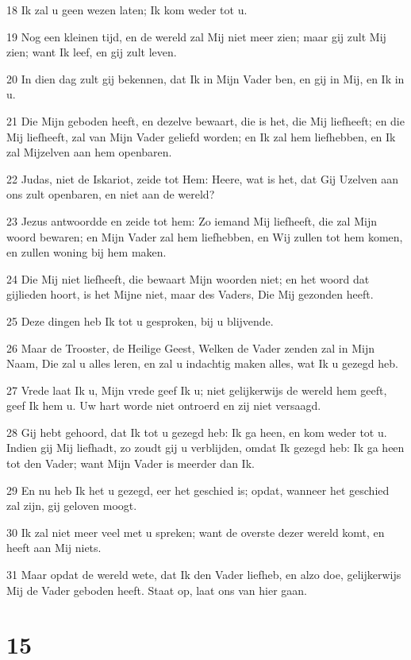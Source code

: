 \par 18 Ik zal u geen wezen laten; Ik kom weder tot u.
\par 19 Nog een kleinen tijd, en de wereld zal Mij niet meer zien; maar gij zult Mij zien; want Ik leef, en gij zult leven.
\par 20 In dien dag zult gij bekennen, dat Ik in Mijn Vader ben, en gij in Mij, en Ik in u.
\par 21 Die Mijn geboden heeft, en dezelve bewaart, die is het, die Mij liefheeft; en die Mij liefheeft, zal van Mijn Vader geliefd worden; en Ik zal hem liefhebben, en Ik zal Mijzelven aan hem openbaren.
\par 22 Judas, niet de Iskariot, zeide tot Hem: Heere, wat is het, dat Gij Uzelven aan ons zult openbaren, en niet aan de wereld?
\par 23 Jezus antwoordde en zeide tot hem: Zo iemand Mij liefheeft, die zal Mijn woord bewaren; en Mijn Vader zal hem liefhebben, en Wij zullen tot hem komen, en zullen woning bij hem maken.
\par 24 Die Mij niet liefheeft, die bewaart Mijn woorden niet; en het woord dat gijlieden hoort, is het Mijne niet, maar des Vaders, Die Mij gezonden heeft.
\par 25 Deze dingen heb Ik tot u gesproken, bij u blijvende.
\par 26 Maar de Trooster, de Heilige Geest, Welken de Vader zenden zal in Mijn Naam, Die zal u alles leren, en zal u indachtig maken alles, wat Ik u gezegd heb.
\par 27 Vrede laat Ik u, Mijn vrede geef Ik u; niet gelijkerwijs de wereld hem geeft, geef Ik hem u. Uw hart worde niet ontroerd en zij niet versaagd.
\par 28 Gij hebt gehoord, dat Ik tot u gezegd heb: Ik ga heen, en kom weder tot u. Indien gij Mij liefhadt, zo zoudt gij u verblijden, omdat Ik gezegd heb: Ik ga heen tot den Vader; want Mijn Vader is meerder dan Ik.
\par 29 En nu heb Ik het u gezegd, eer het geschied is; opdat, wanneer het geschied zal zijn, gij geloven moogt.
\par 30 Ik zal niet meer veel met u spreken; want de overste dezer wereld komt, en heeft aan Mij niets.
\par 31 Maar opdat de wereld wete, dat Ik den Vader liefheb, en alzo doe, gelijkerwijs Mij de Vader geboden heeft. Staat op, laat ons van hier gaan.

\chapter{15}

